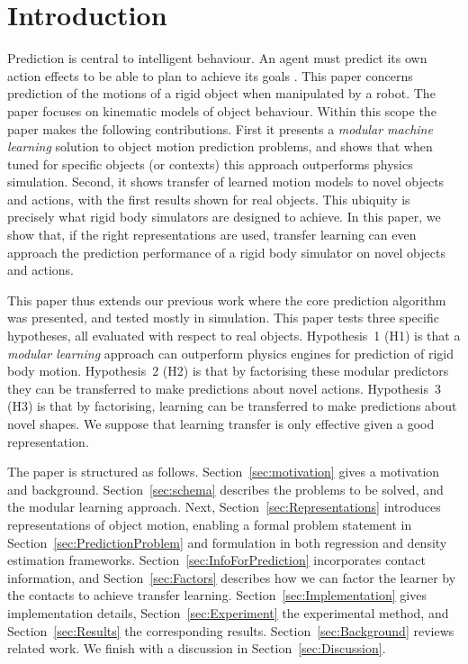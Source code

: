 \section{Introduction}\label{sec:Introduction}

Prediction is central to intelligent behaviour. An agent must predict its own action effects to be able to plan to achieve its goals \citep{craik1967nature}. This paper concerns prediction of the motions of a rigid object when manipulated by a robot. The paper focuses on kinematic models of object behaviour. Within this scope the paper makes the following contributions. First it presents a {\em modular machine learning} solution to object motion prediction problems, and shows that when tuned for specific objects (or contexts) this approach outperforms physics simulation.  Second, it shows transfer of learned motion models to novel objects and actions, with the first results shown for real objects. This ubiquity is precisely what rigid body simulators are designed to achieve. In this paper, we show that, if the right representations are used, transfer learning can even approach the prediction performance of a rigid body simulator on novel objects and actions.

This paper thus extends our previous work \citep{kopicki_prediction_2010,kopicki-etal-icra11}  where the core prediction algorithm was presented, and tested mostly in simulation.  This paper tests three specific hypotheses, all evaluated with respect to real objects. Hypothesis~1 (H1) is that a {\em modular learning} approach can outperform physics engines for prediction of rigid body motion.  Hypothesis~2 (H2) is that by factorising these modular predictors they can be transferred to make predictions about novel actions. Hypothesis~3 (H3) is that by factorising, learning can be transferred  to make predictions about novel shapes. We suppose that learning transfer is only effective given a good representation.

The paper is structured as follows.  Section~\ref{sec:motivation} gives a motivation and background. Section~\ref{sec:schema} describes the problems to be solved, and the modular learning approach. Next, Section~\ref{sec:Representations} introduces representations of object motion, enabling a formal problem statement in Section~\ref{sec:PredictionProblem} and formulation in both regression and density estimation frameworks. Section~\ref{sec:InfoForPrediction} incorporates contact information, and Section~\ref{sec:Factors} describes how we can factor the learner by the contacts to achieve transfer learning. Section~\ref{sec:Implementation} gives implementation details, Section~\ref{sec:Experiment} the experimental method, and Section~\ref{sec:Results}
the corresponding results. Section~\ref{sec:Background} reviews related work.  We finish with a discussion in Section~\ref{sec:Discussion}.